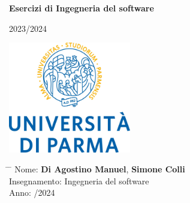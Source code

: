 \documentclass[12pt,a4paper]{article}
\title{}
\author{}
\date{}
\begin{document}
	
	\newcommand{\subf}[2]{%
		{\small\begin{tabular}[t]{@{}c@{}}
				#1\\#2
		\end{tabular}}%
	}
	
	\begin{titlepage}
		\begin{center}
			\vspace*{3cm}
			
			\Huge
			\textbf{Esercizi di Ingegneria del software}
			
			\vspace{0.3cm}
			\Huge
			2023/2024
			
			\vspace{0.8cm}
			\large
			
			
			
			\vspace{0.5cm}
			\LARGE
			
			
			\vspace{1.5cm}
			
			\textbf{}
            \includegraphics[width=0.4\textwidth]{unipr_logo.jpg}
			
			\vfill
			
			
			
			\vspace{0.8cm}
			
			
			
			\Large
			
			
			
			
		\end{center}
		\Large
		\begin{tabbing}
			\hspace*{1em}\= \hspace*{8em} \= \kill %
			\> Nome:\>  \textbf{Di Agostino Manuel}, \textbf{Simone Colli} \\
			\> Insegnamento:\>  Ingegneria del software  \\
			\> Anno:  \> 2023/2024
		\end{tabbing}
		
	\end{titlepage}
	\clearpage
	
\end{document}
